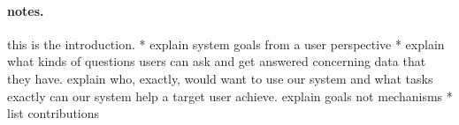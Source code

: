 

\paragraph*{notes.}
this is the introduction.  * explain system goals from a user
perspective * explain what kinds of questions users can ask and get
answered concerning data that they have. explain who, exactly, would
want to use our system and what tasks exactly can our system help a
target user achieve. explain goals not mechanisms * list contributions


